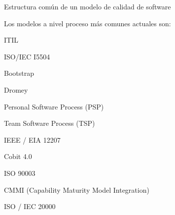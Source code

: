 \documentclass[12pt]{article}
\begin{document}
\vspace{\baselineskip}

\vspace{\baselineskip}

\vspace{\baselineskip}

\vspace{\baselineskip}

\vspace{\baselineskip}

\vspace{\baselineskip}

\vspace{\baselineskip}

\vspace{\baselineskip}

\vspace{\baselineskip}

\vspace{\baselineskip}

\vspace{\baselineskip}

\vspace{\baselineskip}

\vspace{\baselineskip}

\vspace{\baselineskip}

\vspace{\baselineskip}
\begin{Center}
Estructura común de un modelo de calidad de software
\end{Center}\par


\vspace{\baselineskip}

\vspace{\baselineskip}
Los modelos a nivel proceso más comunes actuales son:\par

ITIL\par

 ISO/IEC I5504\par

 Bootstrap \par

Dromey\par

 Personal Software Process (PSP) \par

Team Software Process (TSP) \par

IEEE / EIA 12207 \par

Cobit 4.0 \par

ISO 90003\par

 CMMI (Capability Maturity Model Integration)\par

 ISO / IEC 20000\par


\vspace{\baselineskip}

\vspace{\baselineskip}

\printbibliography
\end{document}
